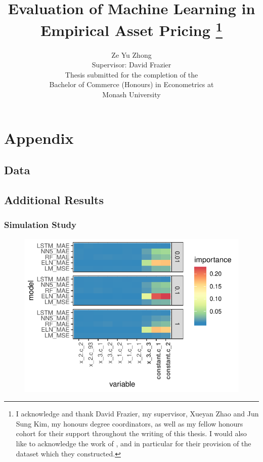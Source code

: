 \documentclass[11pt, a4paper, table]{article}
\title{Evaluation of Machine Learning in Empirical Asset Pricing
\thanks{I acknowledge and thank David Frazier, my supervisor, Xueyan Zhao and Jun Sung Kim, my honours degree coordinators, as well as my fellow honours cohort for their support throughout the writing of this thesis. I would also like to acknowledge the work of \cite{gu_empirical_2018}, and in particular for their provision of the dataset which they constructed.}
}
\author{Ze Yu Zhong \\
Supervisor: David Frazier \\ 
Thesis submitted for the completion of the \\
Bachelor of Commerce (Honours) in Econometrics at \\
Monash University}
\begin{document}
\section{Appendix}

\subsection{Data}

\subsection{Additional Results}

\subsubsection{Simulation Study}





\newpage



\FloatBarrier


\begin{figure}
	\includegraphics[]{../Results/simulation/graphics/simulation_g1_vi.pdf}
\end{figure}
\end{document}
